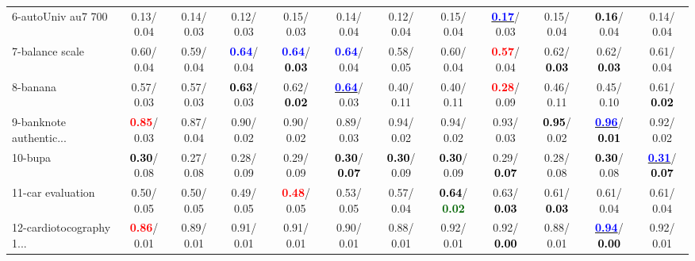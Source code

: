 \begin{table}[h]
\begin{center}
{\begin{tabular}{lc|c|c|c|c|c|c|c|c|c|c}
6-autoUniv au7 700 &   0.13/  0.04 &   0.14/  0.03 &   0.12/  0.03 &   0.15/  0.03 &   0.14/  0.04 &   0.12/  0.04 &   0.15/  0.04 & \underline{\textcolor{blue}{\textbf{  0.17}}}/  0.03 &   0.15/  0.04 & \textcolor{black}{\textbf{  0.16}}/  0.04 &   0.14/  0.04 \\
7-balance scale &   0.60/  0.04 &   0.59/  0.04 & \textcolor{blue}{\textbf{  0.64}}/  0.04 & \textcolor{blue}{\textbf{  0.64}}/\textcolor{black}{\textbf{  0.03}} & \textcolor{blue}{\textbf{  0.64}}/  0.04 &   0.58/  0.05 &   0.60/  0.04 & \textcolor{red}{\textbf{  0.57}}/  0.04 &   0.62/\textcolor{black}{\textbf{  0.03}} &   0.62/\textcolor{black}{\textbf{  0.03}} &   0.61/  0.04 \\ \hline
8-banana &   0.57/  0.03 &   0.57/  0.03 & \textcolor{black}{\textbf{  0.63}}/  0.03 &   0.62/\textcolor{black}{\textbf{  0.02}} & \underline{\textcolor{blue}{\textbf{  0.64}}}/  0.03 &   0.40/  0.11 &   0.40/  0.11 & \textcolor{red}{\textbf{  0.28}}/  0.09 &   0.46/  0.11 &   0.45/  0.10 &   0.61/\textcolor{black}{\textbf{  0.02}} \\
9-banknote authentic... & \textcolor{red}{\textbf{  0.85}}/  0.03 &   0.87/  0.04 &   0.90/  0.02 &   0.90/  0.02 &   0.89/  0.03 &   0.94/  0.02 &   0.94/  0.02 &   0.93/  0.03 & \textcolor{black}{\textbf{  0.95}}/  0.02 & \underline{\textcolor{blue}{\textbf{  0.96}}}/\textcolor{black}{\textbf{  0.01}} &   0.92/  0.02 \\
10-bupa & \textcolor{black}{\textbf{  0.30}}/  0.08 &   0.27/  0.08 &   0.28/  0.09 &   0.29/  0.09 & \textcolor{black}{\textbf{  0.30}}/\textcolor{black}{\textbf{  0.07}} & \textcolor{black}{\textbf{  0.30}}/  0.09 & \textcolor{black}{\textbf{  0.30}}/  0.09 &   0.29/\textcolor{black}{\textbf{  0.07}} &   0.28/  0.08 & \textcolor{black}{\textbf{  0.30}}/  0.08 & \underline{\textcolor{blue}{\textbf{  0.31}}}/\textcolor{black}{\textbf{  0.07}} \\
11-car evaluation &   0.50/  0.05 &   0.50/  0.05 &   0.49/  0.05 & \textcolor{red}{\textbf{  0.48}}/  0.05 &   0.53/  0.05 &   0.57/  0.04 & \textcolor{black}{\textbf{  0.64}}/\textcolor{darkgreen}{\textbf{  0.02}} &   0.63/\textcolor{black}{\textbf{  0.03}} &   0.61/\textcolor{black}{\textbf{  0.03}} &   0.61/  0.04 &   0.61/  0.04 \\
12-cardiotocography 1... & \textcolor{red}{\textbf{  0.86}}/  0.01 &   0.89/  0.01 &   0.91/  0.01 &   0.91/  0.01 &   0.90/  0.01 &   0.88/  0.01 &   0.92/  0.01 &   0.92/\textcolor{black}{\textbf{  0.00}} &   0.88/  0.01 & \underline{\textcolor{blue}{\textbf{  0.94}}}/\textcolor{black}{\textbf{  0.00}} &   0.92/  0.01 \\

\end{tabular}}
\end{center}
\end{table}

